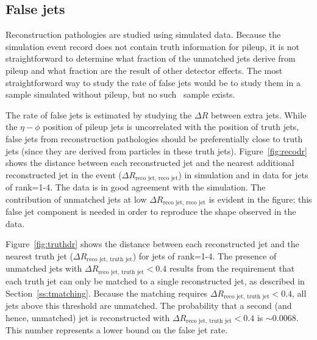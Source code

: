  \subsection{False jets}
Reconstruction pathologies are studied using simulated data. Because the simulation event record does not contain truth information for pileup, it is not straightforward to determine what fraction of the unmatched jets derive from pileup and what fraction are the result of other detector effects. The most straightforward way to study the rate of false jets would be to study them in a sample simulated without pileup, but no such \ttbar\ sample exists. 

The rate of false jets is estimated by studying the $\Delta {R}$ between extra jets. While the $\eta-\phi$ position of pileup jets is uncorrelated with the position of truth jets, false jets from reconstruction pathologies should be preferentially close to truth jets (since they are derived from particles in these truth jets).  
Figure~\ref{fig:recodr} shows the distance between each reconstructed jet and the nearest additional reconstructed jet in the event ($\Delta {R}_{\text{reco jet, reco jet}}$) in simulation and in data for jets of rank=1-4. The data is in good agreement with the simulation. 
The contribution of unmatched jets at low $\Delta {R}_{\text{reco jet, reco jet}}$ is evident in the figure;
this false jet component is needed in order to reproduce the shape observed in the data.


Figure~\ref{fig:truthdr} shows the distance between each reconstructed jet and the nearest truth jet ($\Delta {R}_{\text{reco jet, truth jet}}$) for jets of rank=1-4. The presence of unmatched jets with $\Delta {R}_{\text{reco jet, truth jet}} < 0.4$ results from the requirement that each truth jet can only be matched to a single reconstructed jet, as described in Section~\ref{ss:tmatching}. Because the matching requires $\Delta {R}_{\text{reco jet, truth jet}} < 0.4$, all jets above this threshold are unmatched. The probability that a second (and hence, unmatched) jet is reconstructed with $\Delta {R}_{\text{reco jet, truth jet}} < 0.4$ is $\sim 0.0068$.  This number represents a lower bound on the false jet rate.

